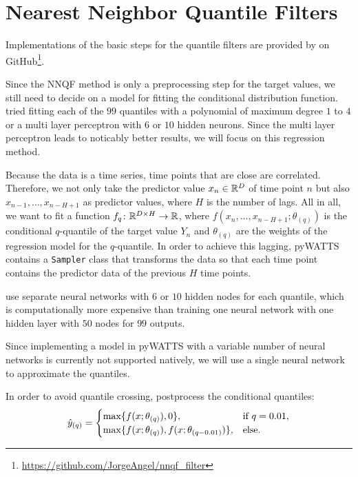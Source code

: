 \section{Nearest Neighbor Quantile Filters}
\label{sec:implementation-nnqf}

Implementations of the basic steps for the quantile filters are provided by \Textcite{Ordiano2019} 
on GitHub\footnote{\url{https://github.com/JorgeAngel/nnqf_filter}}. 

Since the NNQF method is only a preprocessing step for the target values, 
we still need to decide on a model for fitting the 
conditional distribution function. 
\Textcite{Ordiano2019} tried fitting each of the \(99\) quantiles 
with a polynomial of maximum degree \(1\) to \(4\) or a multi layer perceptron 
with \(6\) or \(10\) hidden neurons. Since the multi layer perceptron leads to 
noticably better results, we will focus on this regression method. 

Because the data is a time series, time points that are close are correlated. 
Therefore, we not only take the predictor value \(x_n \in \mathbb{R}^D\) of time point \(n\) 
but also \(x_{n-1}, \ldots, x_{n-H+1}\) as predictor values, where \(H\) is the number of lags.
All in all, we want to fit a function \(f_q\colon \mathbb{R}^{D\times H} \rightarrow \mathbb{R}\), 
where \( f(x_n, \ldots, x_{n-H+1}; \theta_{(q)})\) is the conditional 
\(q\)-quantile of the target value \(Y_n\) and \(\theta_{(q)}\) are the weights 
of the regression model for the \(q\)-quantile.
In order to achieve this lagging, pyWATTS contains a \texttt{Sampler} class
that transforms the data so that each time point contains the 
predictor data of the previous \(H\) time points.

\Textcite{Ordiano2019} use separate neural networks with \(6\) or \(10\) hidden nodes for each quantile, 
which is computationally more expensive than training one neural network with 
one hidden layer with \(50\) nodes for \(99\) outputs. 

Since implementing a model in pyWATTS with a variable number of neural networks is currently 
not supported natively, we will use a single neural network to approximate the quantiles.

In order to avoid quantile crossing, \Textcite{Ordiano2019} postprocess the conditional quantiles:
\[ \hat{y}_{(q)} = \begin{cases}
    \max\{ f(x; \theta_{(q)}), 0 \}, &\text{if } q = 0.01, \\
    \max\{ f(x; \theta_{(q)}), f(x; \theta_{(q-0.01)}) \}, &\text{else.}
\end{cases}\]

